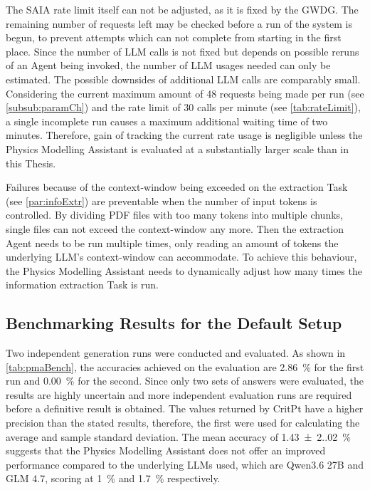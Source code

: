 \documentclass[
	fontsize = 11pt,
	paper = a4,
	draft = false,
	twoside = true,
	titlepage = false
]{scrartcl}
\numberwithin{equation}{subsection}
\begin{document}
	The SAIA rate limit itself can not be adjusted, as it is fixed by the GWDG. The remaining number of requests left may be checked before a run of the system is begun, to prevent attempts which can not complete from starting in the first place. Since the number of \gls{LLM} calls is not fixed but depends on possible reruns of an \gls{Agent} being invoked, the number of \gls{LLM} usages needed can only be estimated. The possible downsides of additional \gls{LLM} calls are comparably small. Considering the current maximum amount of 48 requests being made per run (see \autoref{subsub:paramCh}) and the rate limit of 30 calls per minute (see \autoref{tab:rateLimit}), a single incomplete run causes a maximum additional waiting time of two minutes. Therefore, gain of tracking the current rate usage is negligible unless the Physics Modelling Assistant is evaluated at a substantially larger scale than in this Thesis.

	Failures because of the \gls{context-window} being exceeded on the extraction Task (see \autoref{par:infoExtr}) are preventable when the number of input \glspl{token} is controlled. By dividing PDF files with too many \glspl{token} into multiple chunks, single files can not exceed the \gls{context-window} any more. Then the extraction \gls{Agent} needs to be run multiple times, only reading an amount of \glspl{token} the underlying \gls{LLM}'s \gls{context-window} can accommodate. To achieve this behaviour, the Physics Modelling Assistant needs to dynamically adjust how many times the information extraction Task is run.

	\subsection{Benchmarking Results for the Default Setup} \label{benchmarking:default}
	Two independent generation runs were conducted and evaluated. As shown in \autoref{tab:pmaBench}, the accuracies achieved on the evaluation are \SI[round-mode=places, round-precision=2]{2.86}{\percent} for the first run and \SI[round-mode=places, round-precision=2]{0.00}{\percent} for the second. Since only two sets of answers were evaluated, the results are highly uncertain and more independent evaluation runs are required before a definitive result is obtained. The values returned by CritPt have a higher precision than the stated results, therefore, the first were used for calculating the average and sample standard deviation. The mean accuracy of \SI[round-mode=places, round-precision=2]{1.43(2.02)}{\percent} suggests that the Physics Modelling Assistant does not offer an improved performance compared to the underlying \gls{LLM}s used, which are Qwen3.6 27B and GLM 4.7, scoring at \SI[round-mode=places, round-precision=0]{1}{\percent} and \SI[round-mode=places, round-precision=1]{1.7}{\percent} respectively.
	
\end{document}
